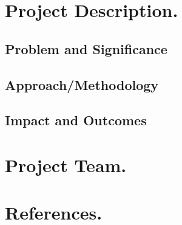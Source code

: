 \documentclass[11pt]{article} %
\begin{document}
\section{Project Description.}

\subsection{Problem and Significance}
\subsection{Approach/Methodology}
\subsection{Impact and Outcomes}
\section{Project Team.}
\section{References.}
\end{document}
